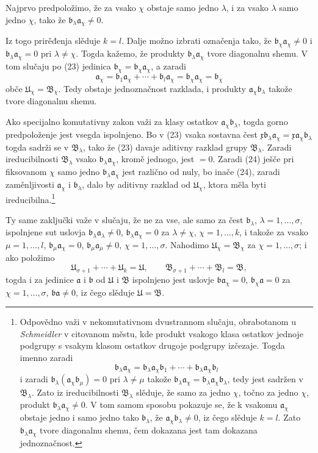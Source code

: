 \documentclass[11pt]{article}
\providecommand{\mU}{\mathfrak U}
\providecommand{\mB}{\mathfrak B}
\providecommand{\ma}{\mathfrak a}
\providecommand{\mb}{\mathfrak b}
\providecommand{\mx}{\mathfrak x}
\begin{document}
Najprvo predpoložimo, že za vsako \(\chi\) obstaje samo jedno \(\lambda\), i za vsako \(\lambda\) samo jedno \(\chi\), tako že \(\mb_\lambda\ma_\chi\ne0\).

Iz togo prirěđenja slěduje \(k=l\). Dalje možno izbrati označenja tako, že \(\mb_\chi\ma_\chi\ne0\) i \(\mb_\lambda\ma_\chi=0\) pri \(\lambda\ne\chi\). Togda kažemo, že produkty \(\mb_\lambda\ma_\chi\) tvore diagonalnu shemu. V tom slučaju po (23) jedinica \(\mb_\chi=\mb_\chi\ma_\chi\), a zaradi
\begin{equation}
 \ma_\chi=\mb_1\ma_\chi+\cdots+\mb_l\ma_\chi=\mb_\chi\ma_\chi=\mb_\chi
\tag{24}
\end{equation}
obče \(\mU_\chi=\mB_\chi\). Tedy obstaje jednoznačnost razklada, i produkty \(\ma_\chi\mb_\lambda\) takože tvore diagonalnu shemu.

Ako specijalno komutativny zakon važi za klasy ostatkov \(\ma_\chi\mb_\lambda\), togda gorno predpoloženje jest vsegda ispolnjeno. Bo v (23) vsaka sostavna čest \(\mx\mb_\lambda\ma_\chi=\mx\ma_\chi\mb_\lambda\) togda sadrži se v \(\mB_\lambda\), tako že (23) davaje aditivny razklad grupy \(\mB_\lambda\). Zaradi ireducibilnosti \(\mB_\lambda\) vsako \(\mb_\lambda\ma_\chi\), kromě jednogo, jest \(=0\). Zaradi (24) ješče pri fiksovanom \(\chi\) samo jedno \(\mb_\lambda\ma_\chi\) jest različno od nuly, bo inače (24), zaradi zaměnljivosti \(\ma_\chi\) i \(\mb_\lambda\), dalo by aditivny razklad od \(\mU_\chi\), ktora měla byti ireducibilna.\footnote{Odpovědno važi v nekomutativnom dvustrannom slučaju, obrabotanom u \emph{Schmeidler} v citovanom městu, kde produkt vsakogo klasa ostatkov jednoje podgrupy s vsakym klasom ostatkov drugoje podgrupy izčezaje. Togda imenno zaradi
\[
\mb_\lambda\ma_\chi=\mb_\lambda\ma_\chi\mb_1+\cdots+\mb_\lambda\ma_\chi\mb_l
\]
i zaradi \(\mb_\lambda(\ma_\chi\mb_\mu)=0\) pri \(\lambda\ne\mu\) takože \(\mb_\lambda\ma_\chi=\mb_\lambda\ma_\chi\mb_\lambda\), tedy jest sadržen v \(\mB_\lambda\). Zato iz ireducibilnosti \(\mB_\lambda\) slěduje, že samo za jedno \(\chi\), točno za jedno \(\chi\), produkt \(\mb_\lambda\ma_\chi\ne0\). V tom samom sposobu pokazuje se, že k vsakomu \(\ma_\chi\) obstaje jedno i samo jedno tako \(\mb_\lambda\), že \(\ma_\chi\mb_\lambda\ne0\), iz čego slěduje \(k=l\). Zato \(\mb_\lambda\ma_\chi\) tvore diagonalnu shemu, čem dokazana jest tam dokazana jednoznačnost.}

Ty same zaključki važe v slučaju, že ne za vse, ale samo za čest \(\mb_\lambda\), \(\lambda=1,\ldots,\sigma\), ispolnjene sut uslovja \(\mb_\lambda\ma_\lambda\ne0\), \(\mb_\lambda\ma_\chi=0\) za \(\lambda\ne\chi\), \(\chi=1,\ldots,k\), i takože za vsako \(\mu=1,\ldots,l\), \(\mb_\mu\ma_\chi=0\), \(\mb_\mu\ma_\mu\ne0\), \(\chi=1,\ldots,\sigma\). Nahodimo \(\mU_\chi=\mB_\chi\) za \(\chi=1,\ldots,\sigma\); i ako položimo
\[
 \mU_{\sigma+1}+\cdots+\mU_k=\mU,
 \qquad
 \mB_{\sigma+1}+\cdots+\mB_l=\mB,
\]
togda i za jedinice \(\ma\) i \(\mb\) od \(\mU\) i \(\mB\) ispolnjeno jest uslovje \(\mb\ma_\chi=0\), \(\mb_\chi\ma=0\) za \(\chi=1,\ldots,\sigma\), \(\mb\ma\ne0\), iz čego slěduje \(\mU=\mB\).
\end{document}
